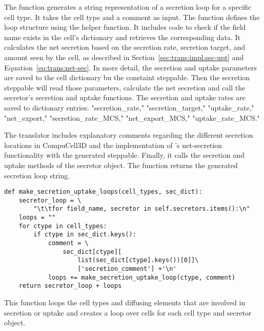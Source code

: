 The  function generates a string representation of a secretion loop for a specific cell type. It takes the cell type and a comment as input. The function defines the loop structure using the  helper function. It includes code to check if the field name exists in the cell's dictionary and retrieves the corresponding data. It calculates the net secretion based on the secretion rate, secretion target, and amount seen by the cell, as described in Section~\ref{sec:trans:impl:sec-upt} and Equation~\ref{eq:trans:net-sec}. In more detail, the secretion and uptake parameters are saved to the cell dictionary bu the constaint steppable. Then the secretion steppable will read those parameters, calculate the net secretion and call the secretor's secretion and uptake functions. The secretion and uptake rates are saved to dictionary entries: "secretion\_rate," "secretion\_target," "uptake\_rate," "net\_export," "secretion\_rate\_MCS," "net\_export\_MCS," "uptake\_rate\_MCS."

The translator includes explanatory comments regarding the different secretion locations in CompuCell3D and the implementation of \psc's net-secretion functionality with the generated steppable. Finally, it calls the secretion and uptake methods of the secretor object. The function returns the generated secretion loop string.

\begin{listing}[H]%
\begin{verbatim}
def make_secretion_uptake_loops(cell_types, sec_dict):
    secretor_loop = \
        "\t\tfor field_name, secretor in self.secretors.items():\n"
    loops = ""
    for ctype in cell_types:
        if ctype in sec_dict.keys():
            comment = \
                sec_dict[ctype][
                    list(sec_dict[ctype].keys())[0]]\
                    ['secretion_comment'] +'\n'
            loops += make_secretion_uptake_loop(ctype, comment)
    return secretor_loop + loops
\end{verbatim}
\caption{This function loops the cell types and diffusing elements that are involved in secretion or uptake and creates a \ccds loop over cells for each cell type and secretor object.}\label{code:trans:cc3d:sec-step:gsups:sec-loops}
\end{listing}

